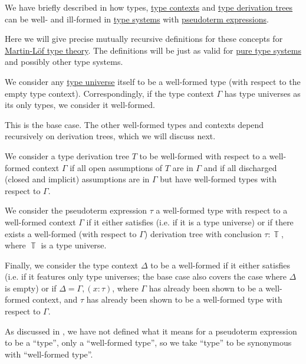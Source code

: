 \begin{definition}\label{def:mltt_well_formed_context}\mimprovised
  We have briefly described in  how types, \hyperref[def:type_context]{type contexts} and \hyperref[def:type_derivation_tree]{type derivation trees} can be well- and ill-formed in \hyperref[def:abstract_type_system]{type systems} with \hyperref[con:pseudoterm_expression]{pseudoterm expressions}.

  Here we will give precise mutually recursive definitions for these concepts for \hyperref[def:mltt]{Martin-L\"of type theory}. The definitions will be just as valid for \hyperref[def:pure_type_system]{pure type systems} and possibly other type systems.

  \begin{thmenum}
     We consider any \hyperref[con:type_universe]{type universe} itself to be a well-formed type (with respect to the empty type context). Correspondingly, if the type context \( \Gamma \) has type universes as its only types, we consider it well-formed.

    This is the base case. The other well-formed types and contexts depend recursively on derivation trees, which we will discuss next.

     We consider a type derivation tree \( T \) to be well-formed with respect to a well-formed context \( \Gamma \) if all open assumptions of \( T \) are in \( \Gamma \) and if all discharged (closed and implicit) assumptions are  in \( \Gamma \) but have well-formed types with respect to \( \Gamma \).

     We consider the pseudoterm expression \( \tau \) a well-formed type with respect to a well-formed context \( \Gamma \) if it either satisfies  (i.e. if it is a type universe) or if there exists a well-formed (with respect to \( \Gamma \)) derivation tree with conclusion \( \tau: \BbbT \), where \( \BbbT \) is a type universe.

     Finally, we consider the type context \( \Delta \) to be a well-formed if it either satisfies  (i.e. if it features only type universes; the base case also covers the case where \( \Delta \) is empty) or if \( \Delta = \Gamma, (x: \tau) \), where \( \Gamma \) has already been shown to be a well-formed context, and \( \tau \) has already been shown to be a well-formed type with respect to \( \Gamma \).
  \end{thmenum}
\end{definition}
\begin{comments}
  \item As discussed in , we have not defined what it means for a pseudoterm expression to be a \enquote{type}, only a \enquote{well-formed type}, so we take \enquote{type} to be synonymous with \enquote{well-formed type}.
\end{comments}

